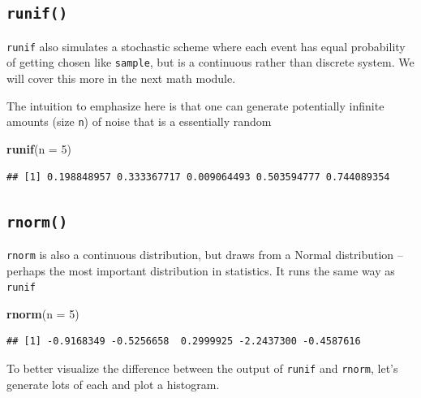 \documentclass[
]{book}
\newenvironment{Shaded}{\begin{snugshade}}{\end{snugshade}}
\newcommand{\DataTypeTok}[1]{\textcolor[rgb]{0.13,0.29,0.53}{#1}}
\newcommand{\DecValTok}[1]{\textcolor[rgb]{0.00,0.00,0.81}{#1}}
\newcommand{\KeywordTok}[1]{\textcolor[rgb]{0.13,0.29,0.53}{\textbf{#1}}}
\newcommand{\NormalTok}[1]{#1}
\theoremstyle{definition}
\theoremstyle{definition}
\theoremstyle{definition}
\theoremstyle{remark}
\begin{document}
\hypertarget{runif}{%
\subsection*{\texorpdfstring{\texttt{runif()}}{runif()}}\label{runif}}

\texttt{runif} also simulates a stochastic scheme where each event has equal probability of getting chosen like \texttt{sample}, but is a continuous rather than discrete system. We will cover this more in the next math module.

The intuition to emphasize here is that one can generate potentially infinite amounts (size \texttt{n}) of noise that is a essentially random

\begin{Shaded}
\begin{Highlighting}[]
\KeywordTok{runif}\NormalTok{(}\DataTypeTok{n =} \DecValTok{5}\NormalTok{)}
\end{Highlighting}
\end{Shaded}

\begin{verbatim}
## [1] 0.198848957 0.333367717 0.009064493 0.503594777 0.744089354
\end{verbatim}

\hypertarget{rnorm}{%
\subsection*{\texorpdfstring{\texttt{rnorm()}}{rnorm()}}\label{rnorm}}

\texttt{rnorm} is also a continuous distribution, but draws from a Normal distribution -- perhaps the most important distribution in statistics. It runs the same way as \texttt{runif}

\begin{Shaded}
\begin{Highlighting}[]
\KeywordTok{rnorm}\NormalTok{(}\DataTypeTok{n =} \DecValTok{5}\NormalTok{)}
\end{Highlighting}
\end{Shaded}

\begin{verbatim}
## [1] -0.9168349 -0.5256658  0.2999925 -2.2437300 -0.4587616
\end{verbatim}

To better visualize the difference between the output of \texttt{runif} and \texttt{rnorm}, let's generate lots of each and plot a histogram.
\end{document}
